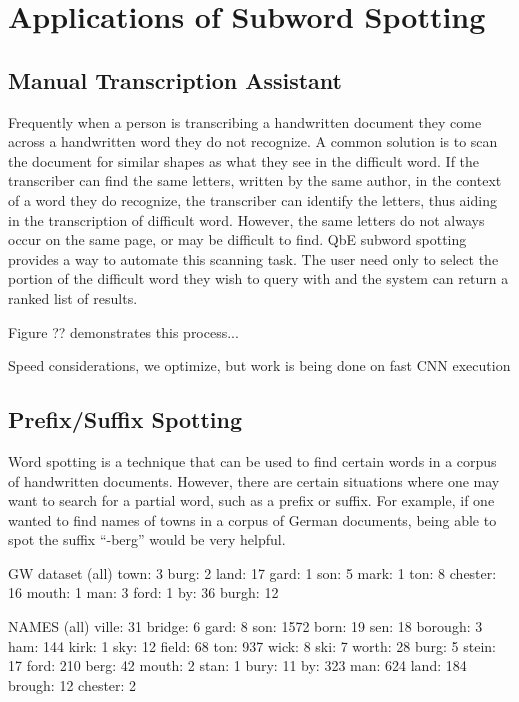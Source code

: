\documentclass[ms,electronic,twosidetoc,letterpaper,chaptercenter,parttop,lol,lof,lot]{byumsphd}
\begin{document}

\chapter{Applications of Subword Spotting}\label{applications}

\section{Manual Transcription Assistant}
Frequently when a person is transcribing a handwritten document they come across a handwritten word they do not recognize. A common solution is to scan the document for similar shapes as what they see in the difficult word. If the transcriber can find the same letters, written by the same author, in the context of a word they do recognize, the transcriber can identify the letters, thus aiding in the transcription of difficult word. However, the same letters do not always occur on the same page, or may be difficult to find. QbE subword spotting provides a way to automate this scanning task. The user need only to select the portion of the difficult word they wish to query with and the system can return a ranked list of results.

Figure ?? demonstrates this process...

Speed considerations, we optimize, but work is being done on fast CNN execution

\section{Prefix/Suffix Spotting}
Word spotting is a technique that can be used to find certain words in a corpus of handwritten documents. However, there are certain situations where one may want to search for a partial word, such as a prefix or suffix. For example, if one wanted to find names of towns in a corpus of German documents, being able to spot the suffix ``-berg'' would be very helpful.

GW dataset (all)
town: 3
burg: 2
land: 17
gard: 1
son: 5
mark: 1
ton: 8
chester: 16
mouth: 1
man: 3
ford: 1
by: 36
burgh: 12

NAMES (all)
ville: 31
bridge: 6
gard: 8
son: 1572
born: 19
sen: 18
borough: 3
ham: 144
kirk: 1
sky: 12
field: 68
ton: 937
wick: 8
ski: 7
worth: 28
burg: 5
stein: 17
ford: 210
berg: 42
mouth: 2
stan: 1
bury: 11
by: 323
man: 624
land: 184
brough: 12
chester: 2
\end{document}
